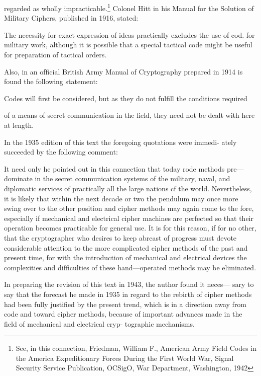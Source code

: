 regarded as wholly impracticable.\footnote{See, in this connection, Friedman, William F., American Army Field Codes in the America Expeditionary Forces During the First World War, Signal Security Service Publication, OCSigO, War Department, Washington, 1942} Colonel Hitt in his Manual for the Solution of Military Ciphers, published in 1916, stated:

The necessity for exact expression of ideas practically excludes the use of cod.
for military work, although it is possible that a special tactical code might be
useful for preparation of tactical orders.

Also, in an ofﬁcial British Army Manual of Cryptography prepared in
1914 is found the following statement:

Codes will ﬁrst be considered, but as they do not fulﬁll the conditions required

of a means of secret communication in the ﬁeld, they need not be dealt with here
at length.

In the 1935 edition of this text the foregoing quotations were immedi-
ately succeeded by the following comment:

It need only he pointed out in this connection that today rode methods pre—
dominate in the secret communication systems of the military, naval, and diplomatic
services of practically all the large nations cf the world. Nevertheless, it is likely
that within the next decade or two the pendulum may once more swing over to the
other position and cipher methods may again come to the fore, especially if
mechanical and electrical cipher machines are perfected so that their operation
becomes practicable for general use. It is for this reason, if for no other, that the
cryptographer who desires to keep abreast of progress must devote considerable
attention to the more complicated cipher methods of the past and present time,
for with the introduction of mechanical and electrical devices the complexities and
difﬁculties of these hand—operated methods may be eliminated.

In preparing the revision of this text in 1943, the author found it neces—
sary to say that the forecast he made in 1935 in regard to the rebirth of
cipher methods had been fully justiﬁed by the present trend, which is in
a direction away from code and toward cipher methods, because of
important advances made in the ﬁeld of mechanical and electrical cryp-
tographic mechanisms.

